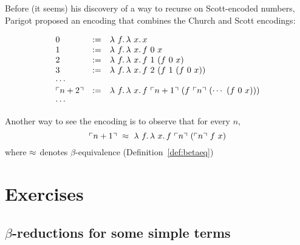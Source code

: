 Before (it seems) his discovery of a way to recurse on Scott-encoded
numbers, Parigot proposed an encoding that combines the Church and
Scott encodings:

\[
\begin{array}{lll}
  0 & := & \lam{f}{\lam{x}{x}} \\
  1 & := & \lam{f}{\lam{x}{f\ 0\ x}} \\
  2 & := & \lam{f}{\lam{x}{f\ 1\ (f\ 0\ x)}} \\
  3 & := & \lam{f}{\lam{x}{f\ 2\ (f\ 1\ (f\ 0\ x))}} \\
  \multicolumn{3}{l}{\cdots} \\
  \rep{n+2} & := & \lam{f}{\lam{x}{f\ \rep{n+1}\ (f\ \rep{n}\ (\cdots\ (f\ 0\ x)))}} \\
  \multicolumn{3}{l}{\cdots} 
\end{array}
\]

\noindent Another way to see the encoding is to observe that for every $n$,
\[
\rep{n+1}\ \betaeq\ \lam{f}{\lam{x}{f\ \rep{n}\ (\rep{n}\ f\ x)}}
\]
\noindent where $\approx$ denotes $\beta$-equivalence (Definition~\ref{def:betaeq})

\section{Exercises}

\subsection{$\beta$-reductions for some simple terms}

